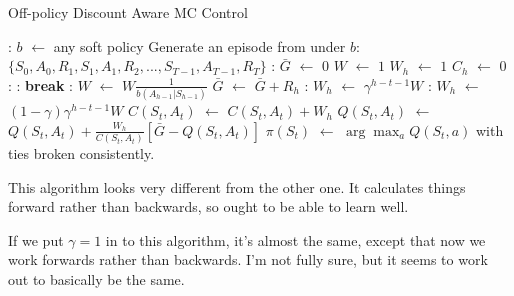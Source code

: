 \documentclass{article}
\newcommand*\Let[2]{\State #1 $\gets$ #2}
\begin{document}
\begin{algorithm}[H]
	\caption{Off-policy Discount Aware MC Control
		\label{alg:off_policy_mc_control_discounted}}
	\begin{algorithmic}[1]
		
		\Statex
		\Statex
		\Loop: 
		\Let{$b$}{any soft policy }		
		\State Generate an episode from under $b$: $\lbrace S_0, A_0, R_1, S_1, A_1, R_2, ..., S_{T-1}, A_{T-1}, R_T \rbrace$
		: 
		\Let{$\bar{G}$}{$0$}
		\Let{$W$}{$1$}
		\Let{$W_h$}{$1$}
		\Let{$C_h$}{0}
		:
			:
				\State \textbf{break}
			\Else:
			\Let{$W$}{$W \frac{1}{b(A_{h-1} | S_{h-1})}$} 
			\EndIf
			\Let{$\bar{G}$}{$\bar{G}+ R_h$} 
			:
			\Let{$W_h$}{$\gamma^{h-t-1}W$} 
			\Else:
				\Let{$W_h$}{$(1-\gamma) \gamma^{h-t-1}W$} 
			\EndIf
			\Let{$C(S_t, A_t)$}{$C(S_t, A_t) + W_h$} 
			\Let{$Q(S_t, A_t)$}{$Q(S_t, A_t) + \frac{W_h}{C(S_t, A_t)}[\bar{G} - Q(S_t, A_t)]$}  
		\EndFor
		\Let{$\pi(S_t)$}{$\arg \max_a Q(S_t, a)$ with ties broken consistently.}
		\EndFor
		\EndLoop
	\end{algorithmic}
\end{algorithm}
This algorithm looks very different from the other one. It calculates things forward rather than backwards, so ought to be able to learn well. 

If we put $\gamma=1$ in to this algorithm, it's almost the same, except that now we work forwards rather than backwards. I'm not fully sure, but it seems to work out to basically be the same. 
\end{document}
